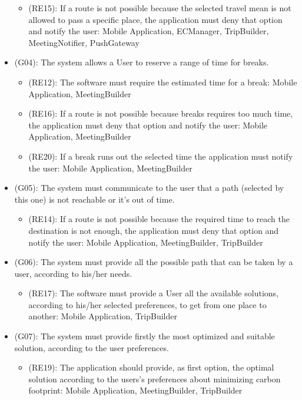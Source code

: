 \documentclass[a4paper,leqno]{article}
\begin{document}
\begin{itemize}
\begin{itemize}
		\item (RE15): If a route is not possible because the selected travel mean is not allowed to pass a specific place, the application must deny that option and notify the user: Mobile Application, ECManager, TripBuilder, MeetingNotifier, PushGateway
	\end{itemize}
	\item (G04): The system allows a User to reserve a range of time for breaks.
	\begin{itemize}
		\item (RE12): The software must require the estimated time for a break: Mobile Application, MeetingBuilder 
		\item (RE16): If a route is not possible because breaks requires too much time, the application must deny that option and notify the user: Mobile Application, MeetingBuilder
		\item (RE20): If a break runs out the selected time the application must notify the user: Mobile Application, MeetingBuilder
	\end{itemize}
	\item (G05): The system must communicate to the user that a path (selected by this one) is not reachable or it's out of time.
	\begin{itemize}
		\item (RE14): If a route is not possible because the required time to reach the destination is not enough, the application must deny that option and notify the user: Mobile Application, MeetingBuilder, TripBuilder
	\end{itemize}
	\item (G06): The system must provide all the possible path that can be taken by a user, according to his/her needs.
	\begin{itemize}
		\item (RE17): The software must provide a User all the available solutions, according to his/her selected preferences, to get from one place to another: Mobile Application, TripBuilder
	\end{itemize}
	\item (G07): The system must provide firstly the most optimized and suitable solution, according to the user preferences.
	\begin{itemize}
		\item (RE19): The application should provide, as first option, the optimal solution according to the users's preferences about minimizing carbon footprint: Mobile Application,  MeetingBuilder, TripBuilder

\end{itemize}
\end{itemize}
\end{document}
